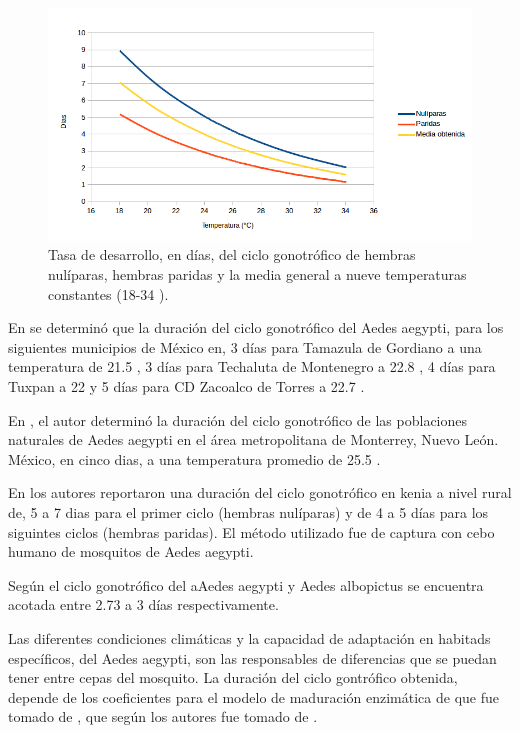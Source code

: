 \begin{figure}[H]
    \centering
    \includegraphics[width=1\textwidth]{capitulo-6/graphics/ciclo-gonotrofico-temperatura.png}
    \caption{\label{fig:ciclo-gonotrofico-temperatura} Tasa de desarrollo, en días, del ciclo
    gonotrófico de hembras nulíparas, hembras paridas y la media general a nueve temperaturas
    constantes (18-34 \textcelsius).}
\end{figure}

En \cite{beltran2001bionomia} se determinó que la duración del ciclo gonotrófico del Aedes
aegypti, para los siguientes municipios de México en, 3 días para Tamazula de Gordiano a una
temperatura de 21.5 \textcelsius, 3 días para Techaluta de Montenegro a  22.8 \textcelsius, 4 días
para Tuxpan a 22 \textcelsius y 5 días para CD Zacoalco de Torres a 22.7 \textcelsius.

En \cite{luevano1993ciclo}, el autor determinó la duración del ciclo gonotrófico de las
poblaciones naturales de Aedes aegypti en el área metropolitana de Monterrey, Nuevo León. México,
en cinco dias, a una temperatura promedio de 25.5 \textcelsius.

En \cite{trpis1986dispersal} los autores reportaron una duración del ciclo gonotrófico en kenia a
nivel rural de, 5 a 7 dias para el primer ciclo (hembras nulíparas) y de 4 a 5 días para los
siguintes ciclos (hembras paridas). El método utilizado fue de captura con cebo humano de
mosquitos de Aedes aegypti.

Según \cite{sivanathan2006ecology} el ciclo gonotrófico del aAedes aegypti y Aedes albopictus se
encuentra acotada entre 2.73 a 3 días respectivamente.

Las diferentes condiciones climáticas y la capacidad de adaptación en habitads específicos, del
Aedes aegypti, son las responsables de diferencias que se puedan tener entre cepas del mosquito.
La duración del ciclo gontrófico obtenida, depende de los coeficientes para el modelo de
maduración enzimática de \cite{sharpe1977reaction} que fue tomado de \cite{otero2006stochastic},
que según los autores fue tomado de \cite{focks1993dynamic}.

